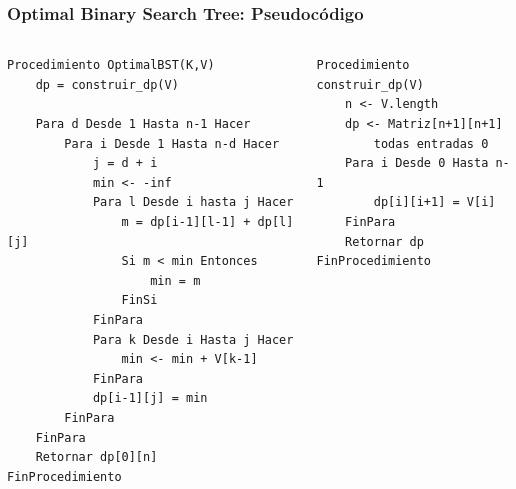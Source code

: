 \documentclass[10pt]{beamer}
\begin{document}
    \begin{frame}[fragile]
        \frametitle{Optimal Binary Search Tree: Pseudocódigo}
        \begin{columns}
            \begin{column}{0.6\textwidth}
                \begin{lstlisting}[basicstyle=\ttfamily\scriptsize]
Procedimiento OptimalBST(K,V)
    dp = construir_dp(V)

    Para d Desde 1 Hasta n-1 Hacer
        Para i Desde 1 Hasta n-d Hacer
            j = d + i
            min <- -inf
            Para l Desde i hasta j Hacer
                m = dp[i-1][l-1] + dp[l][j]
                Si m < min Entonces
                    min = m
                FinSi
            FinPara
            Para k Desde i Hasta j Hacer
                min <- min + V[k-1]
            FinPara
            dp[i-1][j] = min
        FinPara
    FinPara
    Retornar dp[0][n]
FinProcedimiento
                \end{lstlisting}
            \end{column}
            \begin{column}{0.45\textwidth}
                \begin{lstlisting}[basicstyle=\ttfamily\scriptsize]
Procedimiento construir_dp(V)
    n <- V.length
    dp <- Matriz[n+1][n+1]
        todas entradas 0
    Para i Desde 0 Hasta n-1
        dp[i][i+1] = V[i]
    FinPara
    Retornar dp 
FinProcedimiento
                \end{lstlisting}
            \end{column}
        \end{columns}
    \end{frame}
    
\end{document}
